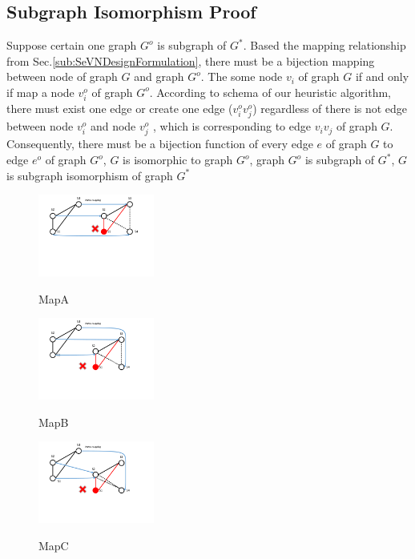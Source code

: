 \subsection{Subgraph Isomorphism Proof}
\label{sec:SubgraphIsomorphismProof}


Suppose certain one graph $G^o$ is subgraph of $G^*$. Based the mapping relationship from Sec.\ref{sub:SeVNDesignFormulation}, there must be a bijection mapping between node of graph $G$ and graph $G^o$. The some node $v_i$ of graph $G$ if and only if map a node $v_i^o$ of graph $G^o$. According to schema of our heuristic algorithm, there must exist one edge or create one edge ($v^o_iv^o_j$) regardless of  there is not edge between node $v^o_i$ and node $v^o_j$ , which is corresponding to edge $v_iv_j$ of graph $G$. Consequently, there must be a bijection function of every edge $e$ of graph $G$ to edge $e^o$ of graph $G^o$, $G$ is isomorphic to graph $G^o$, graph $G^o$ is subgraph of $G^*$, $G$ is subgraph isomorphism of graph $G^*$





\begin{figure}
  \centering
  \includegraphics[width=1.5in]{Fig/MapA}\\
  \caption{MapA}\label{Fig:MapA}
\end{figure}

\begin{figure}
  \centering
  \includegraphics[width=1.5in]{Fig/MapB}\\
  \caption{MapB}\label{Fig:MapB}
\end{figure}



\begin{figure}
  \centering
  \includegraphics[width=1.5in]{Fig/MapC}\\
  \caption{MapC}\label{Fig:MapC}
\end{figure}

